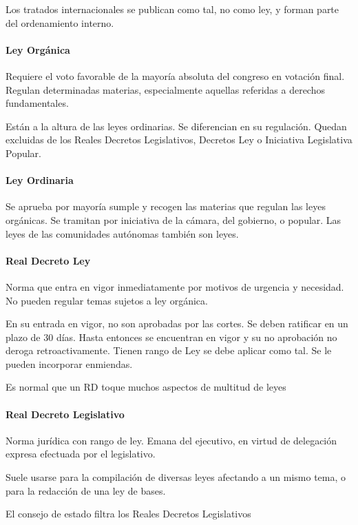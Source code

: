         Los tratados internacionales se publican como tal, no como ley, y forman parte del ordenamiento interno.

    \paragraph{Ley Orgánica}
        Requiere el voto favorable de la mayoría absoluta del congreso en votación final. Regulan determinadas materias, especialmente aquellas referidas a derechos fundamentales.
        
        Están a la altura de las leyes ordinarias. Se diferencian en su regulación. Quedan excluidas de los Reales Decretos Legislativos, Decretos Ley o Iniciativa Legislativa Popular.

    \paragraph{Ley Ordinaria}
        Se aprueba por mayoría sumple y recogen las materias que regulan  las leyes orgánicas. Se tramitan por iniciativa de la cámara, del gobierno, o popular. Las leyes de las comunidades autónomas también son leyes.

    \paragraph{Real Decreto Ley}
        Norma que entra en vigor inmediatamente por motivos de urgencia y necesidad. No pueden regular temas sujetos a ley orgánica.

        En su entrada en vigor, no son aprobadas por las cortes. Se deben ratificar en un plazo de 30 días. Hasta entonces se encuentran en vigor y su no aprobación no deroga retroactivamente. Tienen rango de Ley se debe aplicar como tal. Se le pueden incorporar enmiendas.

        Es normal que un RD toque muchos aspectos de multitud de leyes

    \paragraph{Real Decreto Legislativo}
        Norma jurídica con rango de ley. Emana del ejecutivo, en virtud de delegación expresa efectuada por el legislativo.

        Suele usarse para la compilación de diversas leyes afectando a un mismo tema, o para la redacción de una ley de bases.

        El consejo de estado filtra los Reales Decretos Legislativos

